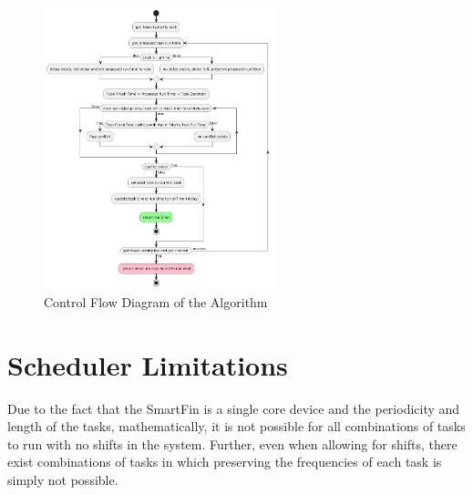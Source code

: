 \documentclass{article}
\begin{document}
\begin{figure}[h]
    \centering
    \includegraphics[width=0.6\textwidth]{control_flow.png}
    \caption{Control Flow Diagram of the Algorithm}
    \label{fig:control_flow_diagram}
\end{figure}

\section{Scheduler Limitations}
Due to the fact that the SmartFin is a single core device and the periodicity and length of the tasks, mathematically, it is not possible for all combinations of tasks to run with no shifts in the system. Further, even when allowing for shifts, there exist combinations of tasks in which preserving the frequencies of each task is simply not possible.


{}

\end{document}
